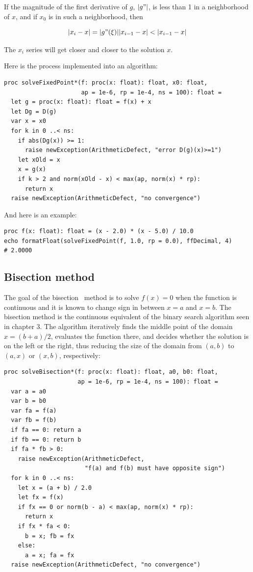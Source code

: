 \documentclass[justified, sixbynine]{tufte-book}
\def\ft{\small\tt}
\theoremstyle{plain}%
\newtheorem * {corollary}{Corollary}
\theoremstyle{definition}
\theoremstyle{remark}
\newtheorem * {remark}{Remark}
\newtheorem * {note}{Note}
\begin{document}
\begin{fullwidth}
If the magnitude of the first derivative of $g$, $|g"|$, is less than 1 in a neighborhood of $x$, and if $x_0$ is in such a neighborhood, then

\begin{equation}
|x_i - x| = |g"(\xi)||x_{i-1}-x| < |x_{i-1}-x|
\end{equation}

The $x_i$ series will get closer and closer to the solution $x$.

Here is the process implemented into an algorithm:

\begin{lstlisting}[caption={in file: {\ft nlib.nim}}]
proc solveFixedPoint*(f: proc(x: float): float, x0: float,
                      ap = 1e-6, rp = 1e-4, ns = 100): float =
  let g = proc(x: float): float = f(x) + x
  let Dg = D(g)
  var x = x0
  for k in 0 ..< ns:
    if abs(Dg(x)) >= 1:
      raise newException(ArithmeticDefect, "error D(g)(x)>=1")
    let xOld = x
    x = g(x)
    if k > 2 and norm(xOld - x) < max(ap, norm(x) * rp):
      return x
  raise newException(ArithmeticDefect, "no convergence")
\end{lstlisting}

And here is an example:

\begin{lstlisting}
proc f(x: float): float = (x - 2.0) * (x - 5.0) / 10.0
echo formatFloat(solveFixedPoint(f, 1.0, rp = 0.0), ffDecimal, 4)
# 2.0000
\end{lstlisting}

\goodbreak\subsection{Bisection method}


The goal of the bisection~\cite{bisection} method is to solve $f(x)=0$ when the function is continuous and it is known to change sign in between $x=a$ and $x=b$. The bisection method is the continuous equivalent of the binary search algorithm seen in chapter 3. The algorithm iteratively finds the middle point of the domain $x=(b+a)/2$, evaluates the function there, and decides whether the solution is on the left or the right, thus reducing the size of the domain from $(a, b)$ to $(a, x)$ or $(x, b)$, respectively:

\begin{lstlisting}[caption={in file: {\ft nlib.nim}}]
proc solveBisection*(f: proc(x: float): float, a0, b0: float,
                     ap = 1e-6, rp = 1e-4, ns = 100): float =
  var a = a0
  var b = b0
  var fa = f(a)
  var fb = f(b)
  if fa == 0: return a
  if fb == 0: return b
  if fa * fb > 0:
    raise newException(ArithmeticDefect,
                       "f(a) and f(b) must have opposite sign")
  for k in 0 ..< ns:
    let x = (a + b) / 2.0
    let fx = f(x)
    if fx == 0 or norm(b - a) < max(ap, norm(x) * rp):
      return x
    if fx * fa < 0:
      b = x; fb = fx
    else:
      a = x; fa = fx
  raise newException(ArithmeticDefect, "no convergence")
\end{lstlisting}


\end{fullwidth}
\end{document}
